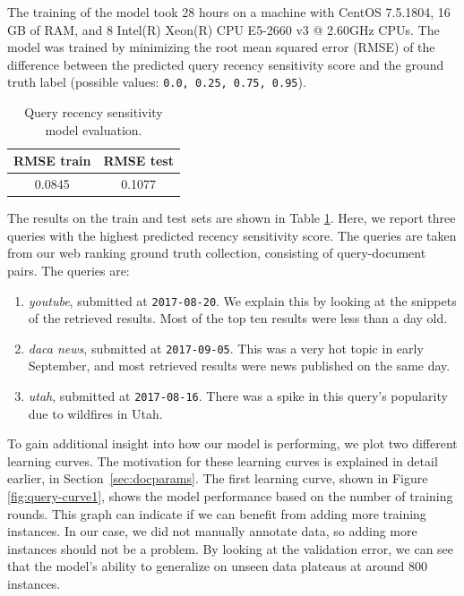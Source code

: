 The training of the model took 28 hours on a machine with CentOS 7.5.1804, 16 GB of RAM, and 8 Intel(R) Xeon(R) CPU E5-2660 v3 @ 2.60GHz CPUs. The model was trained by minimizing the root mean squared error (RMSE) of the difference between the predicted query recency sensitivity score and the ground truth label (possible values: \texttt{0.0, 0.25, 0.75, 0.95}).

\begin{table}[h!]
\centering
\caption{Query recency sensitivity model evaluation.}
\label{tb:queryclass}
\begin{tabular}{@{}cc@{}}
\toprule
RMSE train & RMSE test \\ \midrule
0.0845  & 0.1077 \\ \bottomrule
\end{tabular}
\end{table}

The results on the train and test sets are shown in Table \ref{tb:queryclass}. Here, we report three queries with the highest predicted recency sensitivity score. The queries are taken from our web ranking ground truth collection, consisting of query-document pairs. The queries are:
\begin{enumerate}
	\item \textit{youtube}, submitted at \texttt{2017-08-20}. We explain this by looking at the snippets of the retrieved results. Most of the top ten results were less than a day old.
    \item \textit{daca news}, submitted at \texttt{2017-09-05}. This was a very hot topic in early September, and most retrieved results were news published on the same day.
    \item \textit{utah}, submitted at \texttt{2017-08-16}. There was a spike in this query's popularity due to wildfires in Utah.
\end{enumerate}

To gain additional insight into how our model is performing, we plot two different learning curves. The motivation for these learning curves is explained in detail earlier, in Section~\ref{sec:docparams}. The first learning curve, shown in Figure \ref{fig:query-curve1}, shows the model performance based on the number of training rounds. This graph can indicate if we can benefit from adding more training instances. In our case, we did not manually annotate data, so adding more instances should not be a problem. By looking at the validation error, we can see that the model's ability to generalize on unseen data plateaus at around 800 instances.

